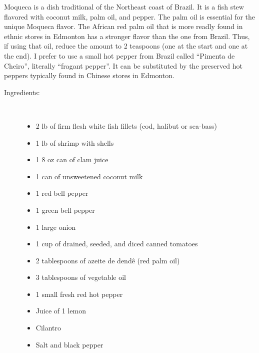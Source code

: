 \documentclass[11pt,letterpaper]{article}
\begin{document}


Moqueca is a dish traditional of the Northeast coast of Brazil. It is
a fish stew flavored with coconut milk, palm oil, and pepper. The palm
oil is essential for the unique Moqueca flavor. The African red palm
oil that is more readly found in ethnic stores in Edmonton has a
stronger flavor than the one from Brazil. Thus, if using that oil,
reduce the amount to 2 teaspoons (one at the start and one at the
end). I prefer to use a small hot pepper from Brazil called ``Pimenta
de Cheiro'', literally ``fragant pepper''. It can be substituted by the
preserved hot peppers typically found in Chinese stores in Edmonton.

\vspace{0.3in}

\begin{description}

\item[Ingredients:]\ \\
	\begin{itemize}
	\item 2 lb of firm flesh white fish fillets (cod, halibut or sea-bass)
	\item 1 lb of shrimp with shells
	\item 1 8 oz can of clam juice
	\item 1 can of unsweetened coconut milk
	\item 1 red bell pepper
	\item 1 green bell pepper
	\item 1 large onion
	\item 1 cup of drained, seeded, and diced canned tomatoes
	\item 2 tablespoons of azeite de dend\^{e} (red palm oil) 
	\item 3 tablespoons of vegetable oil
	\item 1 small fresh red hot pepper
	\item Juice of 1 lemon
	\item Cilantro
	\item Salt and black pepper
	\end{itemize}


\end{description}
\end{document}
